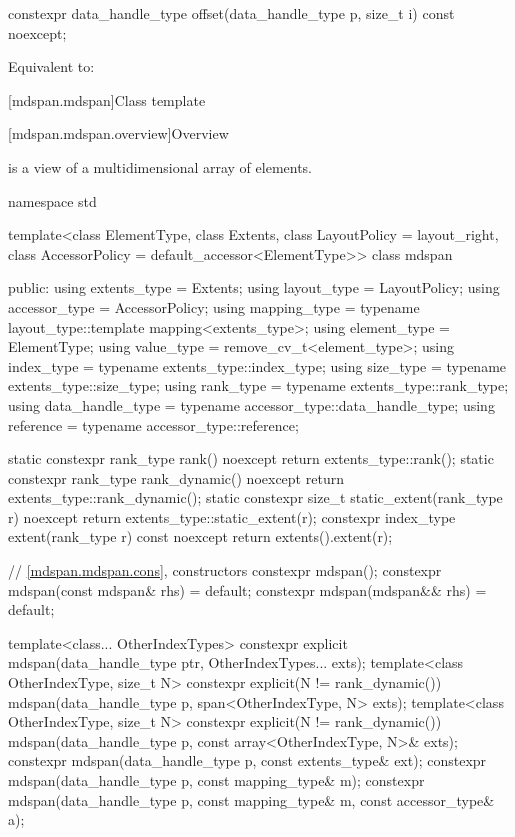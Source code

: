 %
\begin{itemdecl}
constexpr data_handle_type offset(data_handle_type p, size_t i) const noexcept;
\end{itemdecl}

\begin{itemdescr}
\pnum
\effects
Equivalent to: 
\end{itemdescr}

[mdspan.mdspan]{Class template }

[mdspan.mdspan.overview]{Overview}

\pnum
{} is a view of a multidimensional array of elements.

\begin{codeblock}
namespace std {
  template<class ElementType, class Extents, class LayoutPolicy = layout_right,
           class AccessorPolicy = default_accessor<ElementType>>
  class mdspan {
  public:
    using extents_type = Extents;
    using layout_type = LayoutPolicy;
    using accessor_type = AccessorPolicy;
    using mapping_type = typename layout_type::template mapping<extents_type>;
    using element_type = ElementType;
    using value_type = remove_cv_t<element_type>;
    using index_type = typename extents_type::index_type;
    using size_type = typename extents_type::size_type;
    using rank_type = typename extents_type::rank_type;
    using data_handle_type = typename accessor_type::data_handle_type;
    using reference = typename accessor_type::reference;

    static constexpr rank_type rank() noexcept { return extents_type::rank(); }
    static constexpr rank_type rank_dynamic() noexcept { return extents_type::rank_dynamic(); }
    static constexpr size_t static_extent(rank_type r) noexcept
      { return extents_type::static_extent(r); }
    constexpr index_type extent(rank_type r) const noexcept { return extents().extent(r); }

    // \ref{mdspan.mdspan.cons}, constructors
    constexpr mdspan();
    constexpr mdspan(const mdspan& rhs) = default;
    constexpr mdspan(mdspan&& rhs) = default;

    template<class... OtherIndexTypes>
      constexpr explicit mdspan(data_handle_type ptr, OtherIndexTypes... exts);
    template<class OtherIndexType, size_t N>
      constexpr explicit(N != rank_dynamic())
        mdspan(data_handle_type p, span<OtherIndexType, N> exts);
    template<class OtherIndexType, size_t N>
      constexpr explicit(N != rank_dynamic())
        mdspan(data_handle_type p, const array<OtherIndexType, N>& exts);
    constexpr mdspan(data_handle_type p, const extents_type& ext);
    constexpr mdspan(data_handle_type p, const mapping_type& m);
    constexpr mdspan(data_handle_type p, const mapping_type& m, const accessor_type& a);

}}
\end{codeblock}

